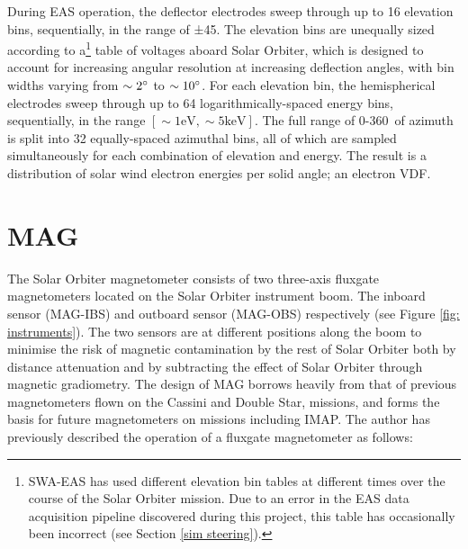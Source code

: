 During EAS operation, the deflector electrodes sweep through up to 16 elevation bins, sequentially, in the range of ±45\degree. The elevation bins are unequally sized according to a\footnote{SWA-EAS has used different elevation bin tables at different times over the course of the Solar Orbiter mission. Due to an error in the EAS data acquisition pipeline discovered during this project, this table has occasionally been incorrect (see Section \ref{sim steering}).} table of voltages aboard Solar Orbiter, which is designed to account for increasing angular resolution at increasing deflection angles, with bin widths varying from \(\sim2\degree\) to \(\sim10\degree\). For each elevation bin, the hemispherical electrodes sweep through up to 64 logarithmically-spaced energy bins, sequentially, in the range \([\sim1\textrm{eV},\sim5\textrm{keV}]\). The full range of 0-360\degree\ of azimuth is split into 32 equally-spaced azimuthal bins, all of which are sampled simultaneously for each combination of elevation and energy. The result is a distribution of solar wind electron energies per solid angle; an electron VDF.
\\

\section{MAG}
The Solar Orbiter magnetometer consists of two three-axis fluxgate magnetometers located on the Solar Orbiter instrument boom. The inboard sensor (MAG-IBS) and outboard sensor (MAG-OBS) respectively (see Figure \ref{fig: instruments}).  The two sensors are at different positions along the boom to minimise the risk of magnetic contamination by the rest of Solar Orbiter both by distance attenuation and by subtracting the effect of Solar Orbiter through magnetic gradiometry. The design of MAG borrows heavily from that of previous magnetometers flown on the Cassini\cite{dougherty2004} and Double Star\cite{carr2005}, missions, and forms the basis for future magnetometers on missions including IMAP\cite{mccomas2018}\cite{dickson2024}. The author has previously described the operation of a fluxgate magnetometer as follows\cite{dickson2024}: 

